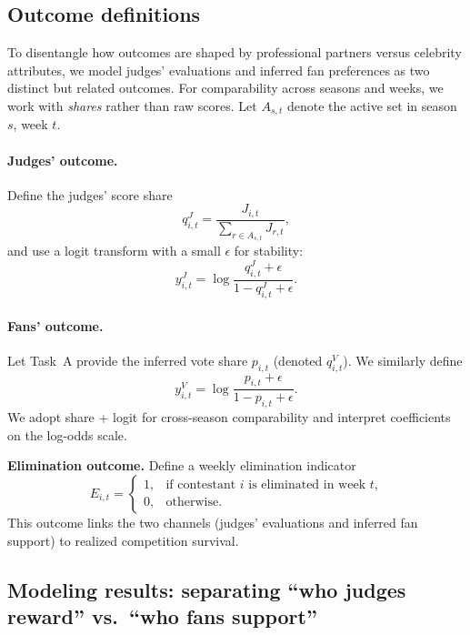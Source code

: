 \subsection{Outcome definitions}
\label{subsec:outcome_definitions_d1}

To disentangle how outcomes are shaped by professional partners versus celebrity attributes, we model
judges' evaluations and inferred fan preferences as two distinct but related outcomes.
For comparability across seasons and weeks, we work with \emph{shares} rather than raw scores.
Let $A_{s,t}$ denote the active set in season $s$, week $t$.

\paragraph{Judges' outcome.}
Define the judges' score share
\begin{equation}
q^{J}_{i,t}=\frac{J_{i,t}}{\sum_{r\in A_{s,t}}J_{r,t}},
\end{equation}
and use a logit transform with a small $\epsilon$ for stability:
\begin{equation}
y^{J}_{i,t}=\log\frac{q^{J}_{i,t}+\epsilon}{1-q^{J}_{i,t}+\epsilon}.
\end{equation}

\paragraph{Fans' outcome.}
Let Task~A provide the inferred vote share $p_{i,t}$ (denoted $q^{V}_{i,t}$). We similarly define
\begin{equation}
y^{V}_{i,t}=\log\frac{p_{i,t}+\epsilon}{1-p_{i,t}+\epsilon}.
\end{equation}
We adopt share + logit for cross-season comparability and interpret coefficients on the log-odds scale.

\noindent\textbf{Elimination outcome.}
Define a weekly elimination indicator
\[
E_{i,t}=
\begin{cases}
1, & \text{if contestant $i$ is eliminated in week $t$,}\\
0, & \text{otherwise.}
\end{cases}
\]
This outcome links the two channels (judges' evaluations and inferred fan support) to realized competition survival.


\subsection{Modeling results: separating ``who judges reward'' vs.\ ``who fans support''}
\label{subsec:modeling_results_d1}

